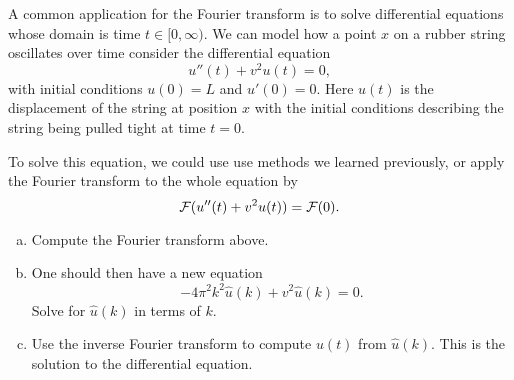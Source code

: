 \documentclass[12pt]{article} %
\begin{document}
%

\begin{problem}
A common application for the Fourier transform is to solve differential equations whose domain is time $t\in [0,\infty)$. We can model how a point $x$ on a rubber string oscillates over time consider the differential equation
\[
u''(t)+v^2u(t)=0,
\]
with initial conditions $u(0)=L$ and $u'(0)=0$. Here $u(t)$ is the displacement of the string at position $x$ with the initial conditions describing the string being pulled tight at time $t=0$.
\begin{figure}[H]
	\centering
	\def\svgwidth{\columnwidth}
	
\end{figure}
To solve this equation, we could use use methods we learned previously, or apply the Fourier transform to the whole equation by
\[
\mathcal{F}(u''(t)+v^2u(t))=\mathcal{F}(0).
\]
\begin{enumerate}[(a)]
	\item Compute the Fourier transform above.
	\item One should then have a new equation
	\[
	-4\pi^2k^2\hat{u}(k)+v^2\hat{u}(k)=0.
	\]
	Solve for $\hat{u}(k)$ in terms of $k$.
	\item Use the inverse Fourier transform to compute $u(t)$ from $\hat{u}(k)$. This is the solution to the differential equation.
\end{enumerate}
\end{problem}
\end{document}
